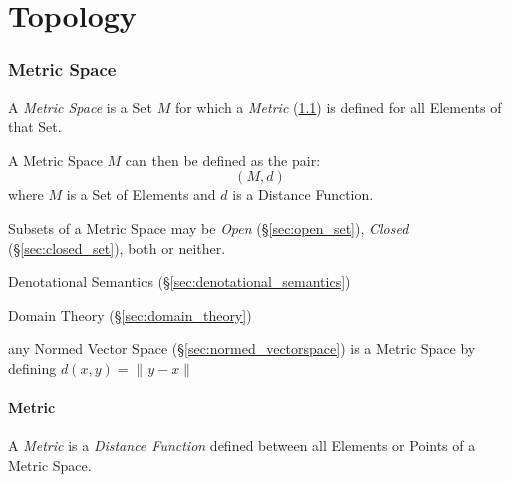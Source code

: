 \part{Topology}\label{part:topology}\cite{lc11}

\section{Metric Space}\label{sec:metric_space}

A \emph{Metric Space} is a Set $M$ for which a \emph{Metric}
(\ref{sec:metric}) is defined for all Elements of that Set.

A Metric Space $M$ can then be defined as the pair:
\[
  (M,d)
\]
where $M$ is a Set of Elements and $d$ is a Distance Function.

Subsets of a Metric Space may be \emph{Open}
(\S\ref{sec:open_set}), \emph{Closed} (\S\ref{sec:closed_set}),
both or neither.

Denotational Semantics (\S\ref{sec:denotational_semantics})

Domain Theory (\S\ref{sec:domain_theory})

any Normed Vector Space (\S\ref{sec:normed_vectorspace}) is a Metric Space by
defining $d(x,y) = \|y-x\|$



\subsection{Metric}\label{sec:metric}

A \emph{Metric} is a \emph{Distance Function} defined between all
Elements or Points of a Metric Space.

